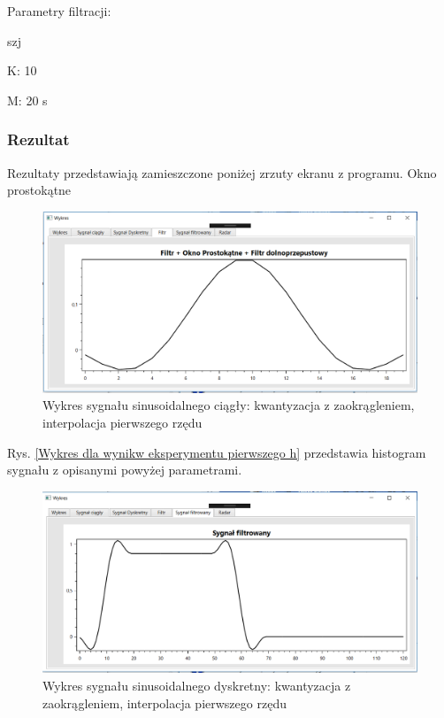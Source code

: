 \documentclass[12pt]{article}
\begin{document}
Parametry filtracji:

\begin{labeling}{szj}
\item [K:] 10
\item [M:] 20 s
\end{labeling}

\subsubsection{Rezultat}

Rezultaty przedstawiają zamieszczone poniżej zrzuty ekranu z programu. 
\newpage
Okno prostokątne
\begin{figure}[h!]
 \centering
 \includegraphics[width=12.3cm]{prostFDOP.PNG}
 \vspace{-0.3cm}
 \caption{Wykres sygnału sinusoidalnego ciągły: kwantyzacja z zaokrągleniem, interpolacja pierwszego rzędu}
 \label{Wykres dla wyników eksperymentu drugiego}
\end{figure}
\newpage
Rys. \ref{Wykres dla wynikw eksperymentu pierwszego h} przedstawia histogram sygnału z opisanymi powyżej parametrami. 
\begin{figure}[h!]
 \centering
 \includegraphics[width=12.3cm]{prostSFDP.PNG}
 \vspace{-0.3cm}
 \caption{Wykres sygnału sinusoidalnego dyskretny: kwantyzacja z zaokrągleniem, interpolacja pierwszego rzędu}
 \label{Histogram dla wyników eksperymentu drugiego}
\end{figure}
\end{document}
